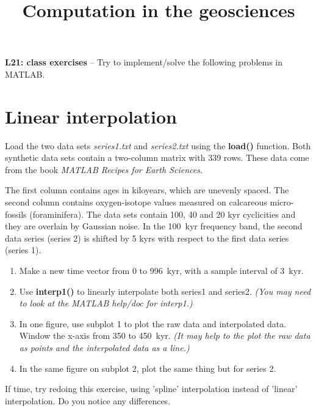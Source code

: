 \documentclass[10pt,fleqn]{article}
\title{Computation in the geosciences}
\date{\empty}
\begin{document}
\textbf{L21: class exercises} -- Try to implement/solve the following problems in MATLAB.

\section*{Linear interpolation}

Load the two data sets \textit{series1.txt} and \textit{series2.txt} using the \textbf{load()} function. Both synthetic data sets contain a two-column matrix with 339 rows. These data come from the book \textit{MATLAB Recipes for Earth Sciences}.

The first column contains ages in kiloyears, which are unevenly spaced. The second column contains oxygen-isotope values measured on calcareous micro-fossils (foraminifera). The data sets contain 100, 40 and 20 kyr cyclicities and they are overlain by Gaussian noise. In the 100~kyr frequency band, the second data series (series 2) is shifted by 5 kyrs with respect to the first data series (series 1).

\begin{enumerate}
	\item Make a new time vector from 0 to 996~kyr, with a sample interval of 3~kyr.
	\item Use \textbf{interp1()} to linearly interpolate both series1 and series2. \textit{(You may need to look at the MATLAB help/doc for interp1.)}
	\item In one figure, use subplot 1 to plot the raw data and interpolated data. Window the x-axis from 350 to 450~kyr. \textit{(It may help to the plot the raw data as points and the interpolated data as a line.)}
	\item In the same figure on subplot 2, plot the same thing but for series 2.
\end{enumerate}

If time, try redoing this exercise, using 'spline' interpolation instead of 'linear' interpolation. Do you notice any differences.
\end{document}
